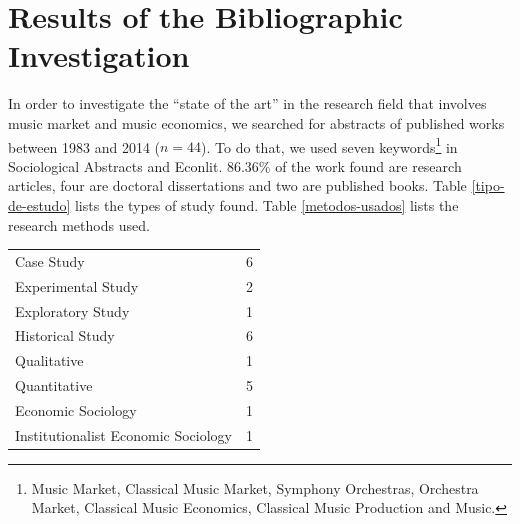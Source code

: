 \documentclass[a4paper, 12pt, openright, oneside, german, french, brazil, english]{abntex2}
\begin{document}
	\chapter[Biliographic Investigation]{Results of the Bibliographic Investigation}
	
		
	
	In order to investigate the ``state of the art'' in the research field that involves music market and music economics, we searched for abstracts of published works between 1983 and 2014 ($n = 44$). To do that, we used seven keywords\footnote{Music Market, Classical Music Market, Symphony Orchestras, Orchestra Market, Classical Music Economics, Classical Music Production and Music.} in Sociological Abstracts and Econlit. 86.36\% of the work found are research articles, four are doctoral dissertations and two are published books. Table \ref{tipo-de-estudo} lists the types of study found. Table \ref{metodos-usados} lists the research methods used.
	
	\begin{table}[ht]
		{\begin{tabular}{lr}
				\hline
				\hline
				Case Study &   6 \\ 
				Experimental Study &   2 \\ 
				Exploratory Study &   1 \\ 
				Historical Study &   6 \\ 
				Qualitative &   1 \\ 
				Quantitative &   5 \\ 
				Economic Sociology &   1 \\ 
				Institutionalist Economic Sociology &   1 \\ 
				\hline
			\end{tabular}
		}
		{}
	\end{table}
	
\end{document}
